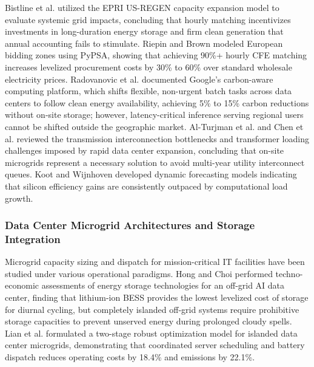 \documentclass[11pt,a4paper]{article}
\begin{document}
Bistline et al. \cite{Bistline2023} utilized the EPRI US-REGEN capacity expansion model to evaluate systemic grid impacts, concluding that hourly matching incentivizes investments in long-duration energy storage and firm clean generation that annual accounting fails to stimulate. Riepin and Brown \cite{Riepin2022} modeled European bidding zones using PyPSA, showing that achieving 90\%+ hourly CFE matching increases levelized procurement costs by 30\% to 60\% over standard wholesale electricity prices. Radovanovic et al. \cite{Radovanovic2022} documented Google's carbon-aware computing platform, which shifts flexible, non-urgent batch tasks across data centers to follow clean energy availability, achieving 5\% to 15\% carbon reductions without on-site storage; however, latency-critical inference serving regional users cannot be shifted outside the geographic market. Al-Turjman et al. \cite{AlTurjman2024} and Chen et al. \cite{Chen2024Grid} reviewed the transmission interconnection bottlenecks and transformer loading challenges imposed by rapid data center expansion, concluding that on-site microgrids represent a necessary solution to avoid multi-year utility interconnect queues. Koot and Wijnhoven \cite{Koot2021} developed dynamic forecasting models indicating that silicon efficiency gains are consistently outpaced by computational load growth.

\subsubsection{Data Center Microgrid Architectures and Storage Integration}
Microgrid capacity sizing and dispatch for mission-critical IT facilities have been studied under various operational paradigms. Hong and Choi \cite{Hong2024} performed techno-economic assessments of energy storage technologies for an off-grid AI data center, finding that lithium-ion BESS provides the lowest levelized cost of storage for diurnal cycling, but completely islanded off-grid systems require prohibitive storage capacities to prevent unserved energy during prolonged cloudy spells. Lian et al. \cite{Lian2023} formulated a two-stage robust optimization model for islanded data center microgrids, demonstrating that coordinated server scheduling and battery dispatch reduces operating costs by 18.4\% and emissions by 22.1\%.
\end{document}
